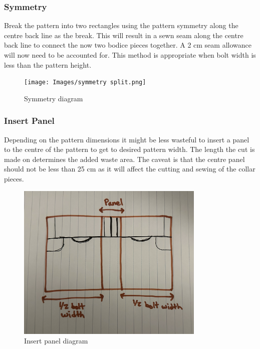 \subsubsection{Symmetry}
Break the pattern into two rectangles using the pattern symmetry along the centre back line as the break. This will result in a sewn seam along the centre back line to connect the now two bodice pieces together. A 2 cm seam allowance will now need to be accounted for. This method is appropriate when bolt width is less than the pattern height.
\begin{figure} [H] %
    \centering %
    \texttt{[image: Images/symmetry split.png]} %
    \caption{Symmetry diagram}
    \label{} %
\end{figure}
\subsubsection{Insert Panel}
Depending on the pattern dimensions it might be less wasteful to insert a panel to the centre of the pattern to get to desired pattern width. The length the cut is made on determines the added waste area.
The caveat is that the centre panel should not be less than 25 cm as it will affect the cutting and sewing of the collar pieces.
\begin{figure} [H] %
    \centering %
    \includegraphics[width = 0.8\textwidth, angle=90]{Images/added panel.png} %
    \caption{Insert panel diagram}
    \label{} %
\end{figure}
